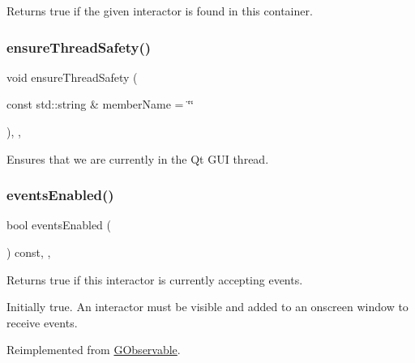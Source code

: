 Returns true if the given interactor is found in this container. 

\mbox{\label{classsgl_1_1GObservable_a284f31528c0520f8e545c03ac9eeac74}} 
\subsubsection{\texorpdfstring{ensure\+Thread\+Safety()}{ensureThreadSafety()}}
{\footnotesize\ttfamily void ensure\+Thread\+Safety (\begin{DoxyParamCaption}\item[{const std\+::string \&}]{member\+Name = {\ttfamily \char`\"{}\char`\"{}} }\end{DoxyParamCaption})\hspace{0.3cm}{\ttfamily [protected]}, {\ttfamily [virtual]}, {\ttfamily [inherited]}}



Ensures that we are currently in the Qt G\+UI thread. 

\mbox{\label{classsgl_1_1GInteractor_a597a370b592e3737d38d9d2f4e2031ea}} 
\subsubsection{\texorpdfstring{events\+Enabled()}{eventsEnabled()}}
{\footnotesize\ttfamily bool events\+Enabled (\begin{DoxyParamCaption}{ }\end{DoxyParamCaption}) const\hspace{0.3cm}{\ttfamily [override]}, {\ttfamily [virtual]}, {\ttfamily [inherited]}}



Returns true if this interactor is currently accepting events. 

Initially true. An interactor must be visible and added to an onscreen window to receive events. 

Reimplemented from \mbox{\hyperlink{classsgl_1_1GObservable_a8ebb3da91032e7f4c34485dabc518b8a}{G\+Observable}}.

